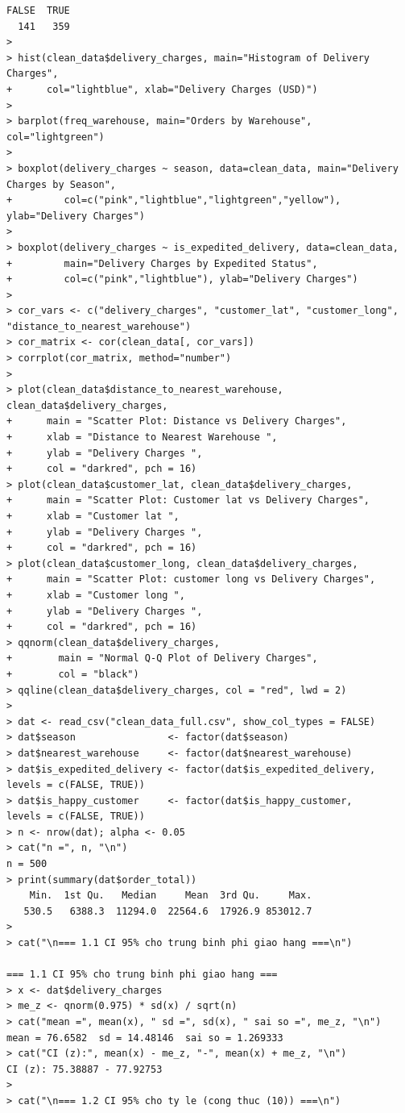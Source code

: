 \documentclass[12pt, a4paper]{article}
\begin{document}
\begin{lstlisting}
FALSE  TRUE 
  141   359 
> 
> hist(clean_data$delivery_charges, main="Histogram of Delivery Charges",
+      col="lightblue", xlab="Delivery Charges (USD)")
> 
> barplot(freq_warehouse, main="Orders by Warehouse", col="lightgreen")
> 
> boxplot(delivery_charges ~ season, data=clean_data, main="Delivery Charges by Season",
+         col=c("pink","lightblue","lightgreen","yellow"), ylab="Delivery Charges")
> 
> boxplot(delivery_charges ~ is_expedited_delivery, data=clean_data,
+         main="Delivery Charges by Expedited Status",
+         col=c("pink","lightblue"), ylab="Delivery Charges")
> 
> cor_vars <- c("delivery_charges", "customer_lat", "customer_long", "distance_to_nearest_warehouse")
> cor_matrix <- cor(clean_data[, cor_vars])
> corrplot(cor_matrix, method="number")
> 
> plot(clean_data$distance_to_nearest_warehouse, clean_data$delivery_charges,
+      main = "Scatter Plot: Distance vs Delivery Charges",
+      xlab = "Distance to Nearest Warehouse ",
+      ylab = "Delivery Charges ",
+      col = "darkred", pch = 16)
> plot(clean_data$customer_lat, clean_data$delivery_charges,
+      main = "Scatter Plot: Customer lat vs Delivery Charges",
+      xlab = "Customer lat ",
+      ylab = "Delivery Charges ",
+      col = "darkred", pch = 16)
> plot(clean_data$customer_long, clean_data$delivery_charges,
+      main = "Scatter Plot: customer long vs Delivery Charges",
+      xlab = "Customer long ",
+      ylab = "Delivery Charges ",
+      col = "darkred", pch = 16)
> qqnorm(clean_data$delivery_charges,
+        main = "Normal Q-Q Plot of Delivery Charges",
+        col = "black")
> qqline(clean_data$delivery_charges, col = "red", lwd = 2)
> 
> dat <- read_csv("clean_data_full.csv", show_col_types = FALSE)
> dat$season                <- factor(dat$season)                                                                        
> dat$nearest_warehouse     <- factor(dat$nearest_warehouse)  
> dat$is_expedited_delivery <- factor(dat$is_expedited_delivery, levels = c(FALSE, TRUE))
> dat$is_happy_customer     <- factor(dat$is_happy_customer,     levels = c(FALSE, TRUE))
> n <- nrow(dat); alpha <- 0.05
> cat("n =", n, "\n")
n = 500 
> print(summary(dat$order_total))   
    Min.  1st Qu.   Median     Mean  3rd Qu.     Max. 
   530.5   6388.3  11294.0  22564.6  17926.9 853012.7 
> 
> cat("\n=== 1.1 CI 95% cho trung binh phi giao hang ===\n")

=== 1.1 CI 95% cho trung binh phi giao hang ===
> x <- dat$delivery_charges
> me_z <- qnorm(0.975) * sd(x) / sqrt(n)       
> cat("mean =", mean(x), " sd =", sd(x), " sai so =", me_z, "\n")
mean = 76.6582  sd = 14.48146  sai so = 1.269333 
> cat("CI (z):", mean(x) - me_z, "-", mean(x) + me_z, "\n")
CI (z): 75.38887 - 77.92753 
> 
> cat("\n=== 1.2 CI 95% cho ty le (cong thuc (10)) ===\n")


\end{lstlisting}
\end{document}
